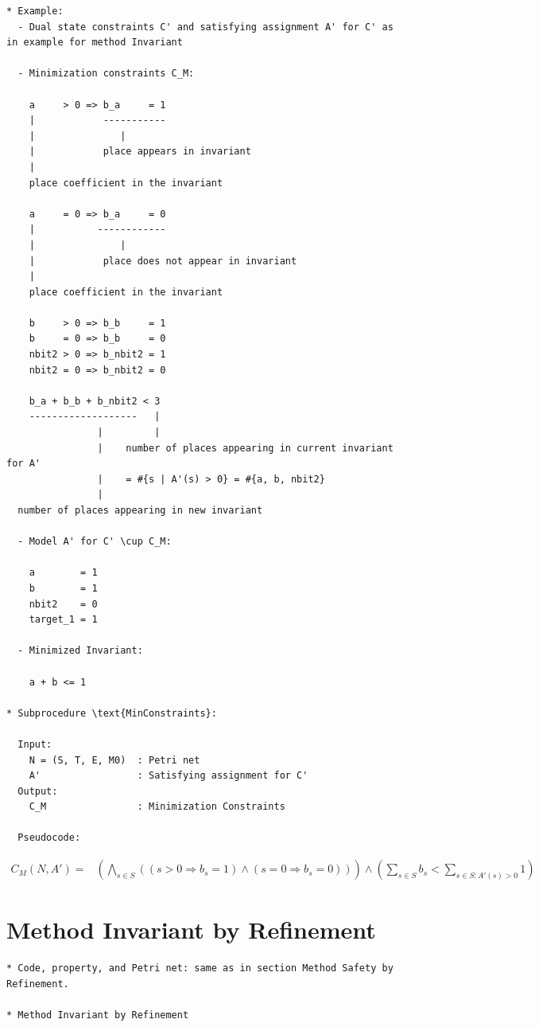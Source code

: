 \documentclass{llncs}
\begin{document}
\newpage
\begin{verbatim}
* Example:
  - Dual state constraints C' and satisfying assignment A' for C' as in example for method Invariant

  - Minimization constraints C_M:

    a     > 0 => b_a     = 1
    |            -----------
    |               |
    |            place appears in invariant
    |
    place coefficient in the invariant

    a     = 0 => b_a     = 0
    |           ------------
    |               |
    |            place does not appear in invariant
    |
    place coefficient in the invariant

    b     > 0 => b_b     = 1
    b     = 0 => b_b     = 0
    nbit2 > 0 => b_nbit2 = 1
    nbit2 = 0 => b_nbit2 = 0

    b_a + b_b + b_nbit2 < 3
    -------------------   |
                |         |
                |    number of places appearing in current invariant for A'
                |    = #{s | A'(s) > 0} = #{a, b, nbit2}
                |
  number of places appearing in new invariant
  
  - Model A' for C' \cup C_M:

    a        = 1
    b        = 1
    nbit2    = 0
    target_1 = 1
    
  - Minimized Invariant:

    a + b <= 1
    
* Subprocedure \text{MinConstraints}:

  Input:
    N = (S, T, E, M0)  : Petri net
    A'                 : Satisfying assignment for C'
  Output:
    C_M                : Minimization Constraints

  Pseudocode:

\end{verbatim}

\begin{align*}
  C_M(N, A') =& \left( \bigwedge_{s \in S} \left(
      (s > 0 \Rightarrow b_s = 1) \land (s = 0 \Rightarrow b_s = 0)
    \right) \right) \land
    \left( \sum_{s \in S} b_s < \sum_{s \in S : A'(s) > 0} 1 \right)
\end{align*}

\newpage

\section{Method Invariant by Refinement}

\begin{verbatim}
* Code, property, and Petri net: same as in section Method Safety by Refinement.

* Method Invariant by Refinement
\end{verbatim}
\end{document}
